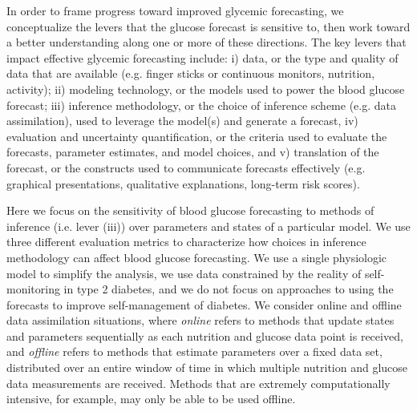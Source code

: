 \documentclass[10pt,letterpaper]{article}
\begin{document}


In order to frame progress toward improved glycemic forecasting, we conceptualize the levers that the glucose forecast is sensitive to, then work toward a better understanding along one or more of these directions. The key levers that impact effective glycemic forecasting include: i) data, or the type and quality of data that are available (e.g. finger sticks or continuous monitors, nutrition, activity); ii) modeling technology, or the models used to power the blood glucose forecast; iii) inference methodology, or the choice of inference scheme (e.g. data assimilation), used to leverage the model(s) and generate a forecast, iv) evaluation and uncertainty quantification, or the criteria used to evaluate the forecasts, parameter estimates, and model choices, and v) translation of the forecast, or the constructs used to communicate forecasts effectively (e.g. graphical presentations, qualitative explanations, long-term risk scores).
 
Here we focus on the sensitivity of blood glucose forecasting to methods of inference (i.e. lever (iii)) over parameters and states of a particular model. We use three different evaluation metrics to characterize how choices in inference methodology can affect blood glucose forecasting. We use a single physiologic model to simplify the analysis, we use data constrained by the reality of self-monitoring in type 2 diabetes, and we do not focus on approaches to using the forecasts to improve self-management of diabetes.  We consider online and offline data assimilation situations, where 
\emph{online} refers to methods that update states and parameters sequentially as each nutrition and glucose data point is received, and \emph{offline} refers to methods that estimate parameters over a fixed data set, distributed over an entire window of time in which multiple nutrition and glucose data measurements are received. Methods that are extremely computationally intensive, for example, may only be able to be used offline.
\end{document}
